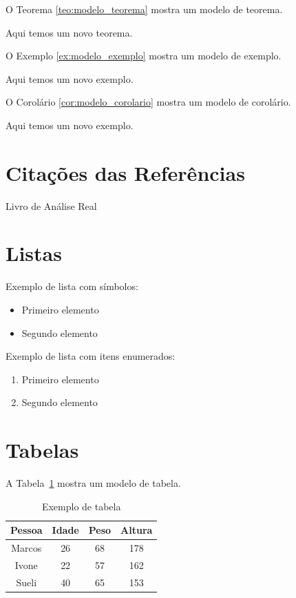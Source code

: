 \documentclass[12pt,a4paper,oneside]{abntex2}
\begin{document}
O Teorema \ref{teo:modelo_teorema} mostra um modelo de teorema.

\begin{teorema}
Aqui temos um novo teorema.
\label{teo:modelo_teorema}
\end{teorema}

O Exemplo \ref{ex:modelo_exemplo} mostra um modelo de exemplo.

\begin{exemplo}
Aqui temos um novo exemplo.
\label{ex:modelo_exemplo}
\end{exemplo}

O Corolário \ref{cor:modelo_corolario} mostra um modelo de corolário.

\begin{corolario}
Aqui temos um novo exemplo.
\label{cor:modelo_corolario}
\end{corolario}


\section{Citações das Referências}

Livro de Análise Real~\cite{lima2004analise}


\section{Listas}

Exemplo de lista com símbolos:

\begin{itemize}
    \item Primeiro elemento
    \item Segundo elemento
\end{itemize}

Exemplo de lista com itens enumerados:

\begin{enumerate}
    \item Primeiro elemento
    \item Segundo elemento
\end{enumerate}


\section{Tabelas}

A Tabela~\ref{tab:modelo_tabela} mostra um modelo de tabela.

\begin{table}[htb]
    \caption{Exemplo de tabela}
    \label{tab:modelo_tabela}
    \centering
    \begin{tabular}{c|c|c|c}
	    \hline
	    \textbf{Pessoa} & \textbf{Idade} & \textbf{Peso} & \textbf{Altura} \\ \hline
	    Marcos & 26    & 68   & 178    \\ \hline
	    Ivone  & 22    & 57   & 162    \\ \hline
	    Sueli  & 40    & 65   & 153    \\ \hline
    \end{tabular}
\end{table}
\end{document}

